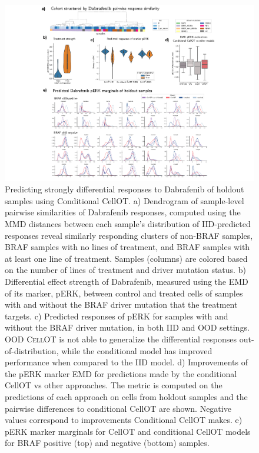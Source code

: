 \begin{figure}[htp!]
  \begin{center}
    \includegraphics[width=\textwidth]{figures/cellot-cohort/condot.pdf}
  \end{center}
  \caption{
    Predicting strongly differential responses to Dabrafenib of holdout samples using Conditional CellOT.
    a) Dendrogram of sample-level pairwise similarities of Dabrafenib responses, computed using the MMD distances between each sample's distribution of IID-predicted responses reveal similarly responding clusters of non-BRAF samples, BRAF samples with no lines of treatment, and BRAF samples with at least one line of treatment.
    Samples (columns) are colored based on the number of lines of treatment and driver mutation status.
    b) Differential effect strength of Dabrafenib, measured using the EMD of its marker, pERK, between control and treated cells of samples with and without the BRAF driver mutation that the treatment targets.
    c) Predicted responses of pERK for samples with and without the BRAF driver mutation, in both IID and OOD settings.
    OOD \textsc{CellOT} is not able to generalize the differential responses out-of-distribution, while the conditional model has improved performance when compared to the IID model.
    d) Improvements of the pERK marker EMD for predictions made by the conditional CellOT vs other approaches. The metric is computed on the predictions of each approach on cells from holdout samples and the pairwise differences to conditional CellOT are shown. Negative values correspond to improvements Conditional CellOT makes. 
    e) pERK marker marginals for CellOT and conditional CellOT models for BRAF positive (top) and negative (bottom) samples.
  }\label{fig:conditional-ot}
\end{figure}

